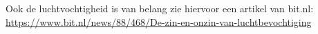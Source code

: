 Ook de luchtvochtigheid is van belang zie hiervoor een artikel van bit.nl: \url{https://www.bit.nl/news/88/468/De-zin-en-onzin-van-luchtbevochtiging}

